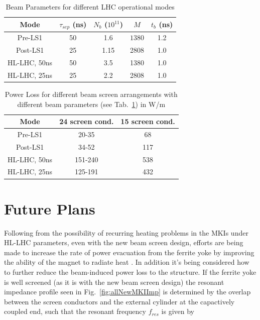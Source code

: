 \documentclass[a4paper,
              ]{jacow}
\begin{document}
\begin{table}
\caption{Beam Parameters for different LHC operational modes}
\label{tab:beamPara}
\begin{center}
\begin{tabular}{c | c | c | c | c}
Mode & $\tau_{sep}$ (ns) & $N_{b}$ ($10^{11}$) & $ M $ & $t_{b}$ (ns) \\ \hline 
Pre-LS1 & 50 & 1.6 & $ 1380 $ & 1.2 \\ \hline 
Post-LS1 & 25 & 1.15 & 2808 & 1.0 \\ \hline 
HL-LHC, 50ns & 50 & 3.5 & 1380 & 1.0 \\ \hline 
HL-LHC, 25ns & 25 & 2.2 & 2808 & 1.0 \\ 
\end{tabular}
\end{center}
\end{table}

\begin{table}
\caption{Power Loss for different beam screen arrangements with different beam parameters (see Tab.~\ref{tab:beamPara}) in W/m}
\label{tab:powLoss}
\begin{center}
\begin{tabular}{c | c | c}
Mode & 24 screen cond. & 15 screen cond. \\ \hline 
Pre-LS1 & 20-35 & 68 \\ \hline 
Post-LS1 & 34-52 & 117 \\ \hline 
HL-LHC, 50ns & 151-240 & 538  \\ \hline 
HL-LHC, 25ns & 125-191 & 432  \\ 
\end{tabular}
\end{center}
\end{table}

\section{Future Plans}

Following from the possibility of recurring heating problems in the MKIs under HL-LHC parameters, even with the new beam screen design, efforts are being made to increase the rate of power evacuation from the ferrite yoke by improving the ability of the magnet to radiate heat \cite{mkiCoolling}. In addition it's being considered how to further reduce the beam-induced power loss to the structure. If the ferrite yoke is well screened (as it is with the new beam screen design) the resonant impedance profile seen in Fig.~\ref{fig:allNewMKIImp} is determined by the overlap between the screen conductors and the external cylinder at the capactively coupled end, such that the resonant frequency $f_{res}$ is given by
\end{document}

